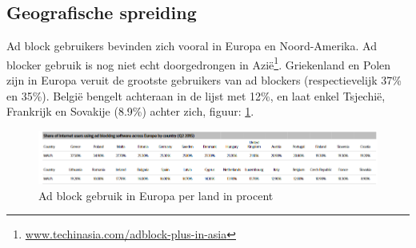\documentclass[pdftex,a4paper,12pt,twoside]{report}
\begin{document}
\subsection{Geografische spreiding}
\label{sec Geografische spreiding}
Ad block gebruikers bevinden zich vooral in Europa en Noord-Amerika. Ad blocker gebruik is nog niet echt doorgedrongen in Azië\footnote{\url{www.techinasia.com/adblock-plus-in-asia}}.
Griekenland en Polen zijn in Europa veruit de grootste gebruikers van ad blockers (respectievelijk 37\% en 35\%). België bengelt achteraan in de lijst met 12\%, en laat enkel Tsjechië, Frankrijk en Sovakije (8.9\%) achter zich, figuur: \ref{fig: ratespercountry}.
\begin{figure}[h!]
\centering
\includegraphics[width=12cm]{img/ratespercountry}
\caption{Ad block gebruik in Europa per land in procent}
\label{fig: ratespercountry}
\end{figure}
\end{document}

